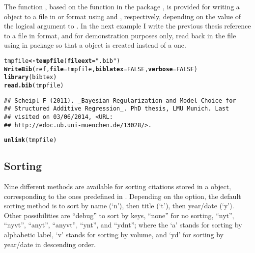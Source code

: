 \documentclass[article]{jss}\usepackage[]{graphicx}\usepackage[]{color}
\makeatletter
\newcommand{\hlnum}[1]{\textcolor[rgb]{0.125,0.125,1}{#1}}%
\newcommand{\hlstr}[1]{\textcolor[rgb]{0.125,0.125,1}{#1}}%
\newcommand{\hlstd}[1]{\textcolor[rgb]{0.251,0.251,0.282}{#1}}%
\newcommand{\hlkwb}[1]{\textcolor[rgb]{0.439,0.251,1}{\textbf{#1}}}%
\newcommand{\hlkwc}[1]{\textcolor[rgb]{0.529,0,0.184}{\textbf{#1}}}%
\newcommand{\hlkwd}[1]{\textcolor[rgb]{0.251,0.251,0.282}{\textbf{#1}}}%
\newenvironment{kframe}{%
 \def\at@end@of@kframe{}%
 \ifinner\ifhmode%
  \def\at@end@of@kframe{\end{minipage}}%
  \begin{minipage}{\columnwidth}%
 \fi\fi%
 \def\FrameCommand##1{\hskip\@totalleftmargin \hskip-\fboxsep
 \colorbox{shadecolor}{##1}\hskip-\fboxsep
     \hskip-\linewidth \hskip-\@totalleftmargin \hskip\columnwidth}%
 \MakeFramed {\advance\hsize-\width
   \@totalleftmargin\z@ \linewidth\hsize
   \@setminipage}}%
 {\par\unskip\endMakeFramed%
 \at@end@of@kframe}
\newenvironment{knitrout}{}{} %
\makeatother
\begin{document}
The function , based on the function  in the package  \citep{Rbibtex}, is provided for writing a  object to a  file in \Biblatex{} or \Bibtex{} format using  and , respectively, depending on the value of the  logical argument to .  In the next example I write the previous thesis reference to a file in \Bibtex{} format, and for demonstration purposes only, read back in the  file using  in package  so that a  object is created instead of a  one.
\begin{knitrout}
\color{fgcolor}\begin{kframe}
\begin{alltt}
\hlstd{tmpfile} \hlkwb{<-} \hlkwd{tempfile}\hlstd{(}\hlkwc{fileext} \hlstd{=} \hlstr{".bib"}\hlstd{)}
\hlkwd{WriteBib}\hlstd{(ref,} \hlkwc{file} \hlstd{= tmpfile,} \hlkwc{biblatex} \hlstd{=} \hlnum{FALSE}\hlstd{,} \hlkwc{verbose} \hlstd{=} \hlnum{FALSE}\hlstd{)}
\hlkwd{library}\hlstd{(bibtex)}
\hlkwd{read.bib}\hlstd{(tmpfile)}
\end{alltt}
\begin{verbatim}
## Scheipl F (2011). _Bayesian Regularization and Model Choice for
## Structured Additive Regression_. PhD thesis, LMU Munich. Last
## visited on 03/06/2014, <URL:
## http://edoc.ub.uni-muenchen.de/13028/>.
\end{verbatim}
\begin{alltt}
\hlkwd{unlink}\hlstd{(tmpfile)}
\end{alltt}
\end{kframe}
\end{knitrout}

\subsection{Sorting}
Nine different methods are available for sorting citations stored in a  object, corresponding to the ones predefined in \Biblatex{}.  Depending on the  option, the default sorting method is  to sort by name (`n'), then title (`t'), then year/date (`y').  Other possibilities are ``debug'' to sort by keys, ``none'' for no sorting, ``nyt'', ``nyvt'', ``anyt'', ``anyvt'', ``ynt'', and ``ydnt''; where the `a' stands for sorting by alphabetic label, `v' stands for sorting by volume, and `yd' for sorting by year/date in descending order.
\end{document}
